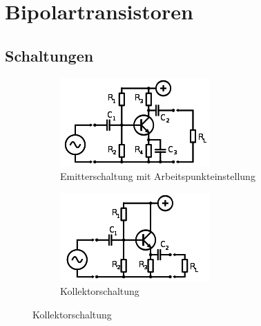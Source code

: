 \section{Bipolartransistoren}
	\subsection{Schaltungen}
		\begin{figure}[h]
			\begin{subfigure}{0.3\textwidth}
			\includegraphics[width=\textwidth]{images/emitterschaltung}
			\begin{center}
			\caption{Emitterschaltung mit Arbeitspunkteinstellung}
			\end{center}
			\end{subfigure}
			\begin{subfigure}{0.3\textwidth}
			\includegraphics[width=\textwidth]{images/kollektorschaltung}
			\begin{center}
			\caption{Kollektorschaltung}
			\end{center}
			\end{subfigure}

\end{figure}
